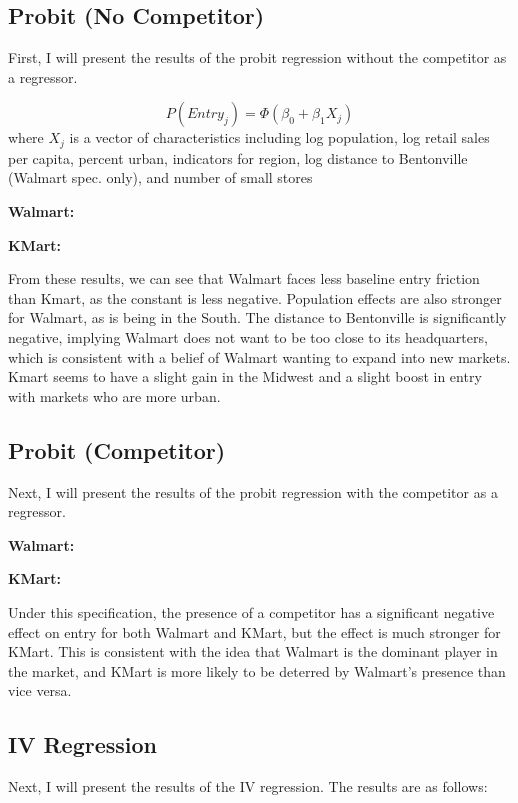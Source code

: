 \documentclass[11pt]{article}
\theoremstyle{definition}
\theoremstyle{remark}
\begin{document}
\subsection{Probit (No Competitor)}

First, I will present the results of the probit regression without the competitor as a regressor.

\begin{equation}
  P(Entry_j) = \Phi(\beta_0 + \beta_1X_j)
\end{equation}
where $X_j$ is a vector of characteristics including log population, log retail sales per capita, percent urban, indicators for region, log distance to Bentonville (Walmart spec. only), and number of small stores

\textbf{Walmart:}



\textbf{KMart:}



From these results, we can see that Walmart faces less baseline entry friction than Kmart, as the constant is less negative. Population effects are also stronger for Walmart, as is being in the South. The distance to Bentonville is significantly negative, implying Walmart does not want to be too close to its headquarters, which is consistent with a belief of Walmart wanting to expand into new markets. Kmart seems to have a slight gain in the Midwest and a slight boost in entry with markets who are more urban.

\subsection{Probit (Competitor)}
Next, I will present the results of the probit regression with the competitor as a regressor.

\textbf{Walmart:}


\textbf{KMart:}


Under this specification, the presence of a competitor has a significant negative effect on entry for both Walmart and KMart, but the effect is much stronger for KMart. This is consistent with the idea that Walmart is the dominant player in the market, and KMart is more likely to be deterred by Walmart's presence than vice versa.

\subsection{IV Regression}
Next, I will present the results of the IV regression. The results are as follows:
\end{document}
